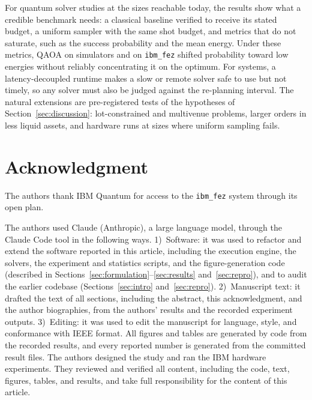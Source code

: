 \documentclass[journal]{IEEEtran}
\begin{document}
For quantum solver studies at the sizes reachable today, the results show what a credible
benchmark needs: a classical baseline verified to receive its stated budget, a uniform
sampler with the same shot budget, and metrics that do not saturate, such as the success
probability and the mean energy. Under these metrics, QAOA on simulators and on
\texttt{ibm\_fez} shifted probability toward low energies without reliably concentrating it
on the optimum. For systems, a latency-decoupled runtime makes a slow or remote solver safe
to use but not timely, so any solver must also be judged against the re-planning interval.
The natural extensions are pre-registered tests of the hypotheses of
Section~\ref{sec:discussion}: lot-constrained and multivenue problems, larger orders in less
liquid assets, and hardware runs at sizes where uniform sampling fails.

\section*{Acknowledgment}
The authors thank IBM Quantum for access to the \texttt{ibm\_fez} system through its open
plan.%

The authors used Claude (Anthropic), a large language model, through the Claude Code tool
in the following ways. 1)~Software: it was used to refactor and extend the software
reported in this article, including the execution engine, the solvers, the experiment and
statistics scripts, and the figure-generation code (described in
Sections~\ref{sec:formulation}--\ref{sec:results} and~\ref{sec:repro}), and to audit the earlier codebase (Sections~\ref{sec:intro}
and~\ref{sec:repro}). 2)~Manuscript text: it drafted the text of all sections, including the abstract, this acknowledgment, and the author biographies,
from the authors' results and the recorded experiment outputs. 3)~Editing: it was used to
edit the manuscript for language, style, and conformance with IEEE format. All figures and
tables are generated by code from the recorded results, and every reported number is
generated from the committed result files. The authors designed the study and ran the IBM
hardware experiments. They reviewed and verified all content, including the code, text,
figures, tables, and results, and take full responsibility for the content of this article.
\end{document}
